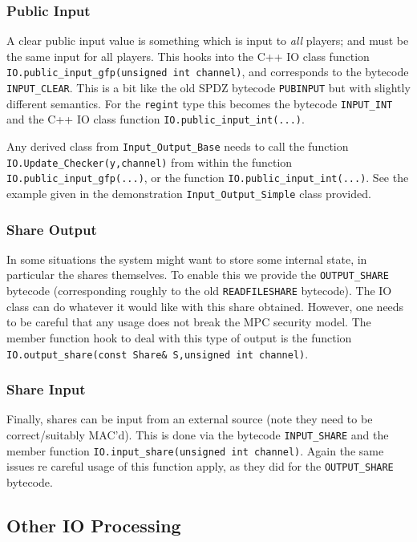 \subsubsection{Public Input}
A clear public input value is something which is input to
{\em all} players; and must be the same input for all players.
This hooks into the C++ IO class function 
\verb+IO.public_input_gfp(unsigned int channel)+, and corresponds to the bytecode
\verb+INPUT_CLEAR+.
This is a bit like the old SPDZ bytecode \verb+PUBINPUT+
but with slightly different semantics.
For the \verb|regint| type this becomes the bytecode \verb+INPUT_INT+
and the C++ IO class function
\verb+IO.public_input_int(...)+.

Any derived class from \verb+Input_Output_Base+ needs to call
the function \verb+IO.Update_Checker(y,channel)+ from within the
function \verb+IO.public_input_gfp(...)+,
or the function \verb+IO.public_input_int(...)+.
See the example given in the demonstration \verb+Input_Output_Simple+ class provided.

\subsubsection{Share Output}
In some situations the system might want to store some
internal state, in particular the shares themselves.
To enable this we provide the \verb+OUTPUT_SHARE+
bytecode (corresponding roughly to the old 
\verb+READFILESHARE+ bytecode). The IO class can do
whatever it would like with this share obtained. However,
one needs to be careful that any usage does not break the
MPC security model.
The member function hook to deal with this type of
output is the function
\verb+IO.output_share(const Share& S,unsigned int channel)+.

\subsubsection{Share Input}
Finally, shares can be input from an external source
(note they need to be correct/suitably MAC'd). This
is done via the bytecode \verb+INPUT_SHARE+ and the
member function \verb+IO.input_share(unsigned int channel)+.
Again the same issues re careful usage of this function
apply, as they did for the \verb+OUTPUT_SHARE+ bytecode.


\subsection{Other IO Processing}


